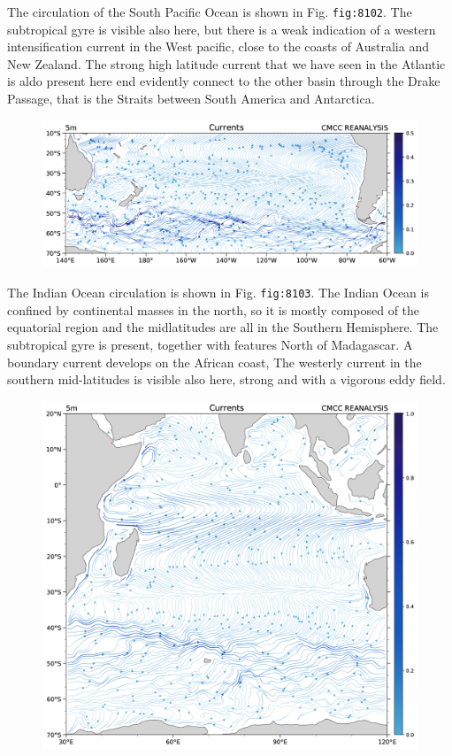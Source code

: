The circulation of the South Pacific Ocean is shown in Fig.
\texttt{fig:8102}. The subtropical gyre is visible also here, but there
is a weak indication of a western intensification current in the West
pacific, close to the coasts of Australia and New Zealand. The strong
high latitude current that we have seen in the Atlantic is aldo present
here end evidently connect to the other basin through the Drake Passage,
that is the Straits between South America and Antarctica.

\begin{figure}
\centering
\includegraphics[width = .7 \textwidth]{figs/GD/UVstream5mGLOBSP.png}
\caption{} \label{fig:}
\end{figure}

The Indian Ocean circulation is shown in Fig. \texttt{fig:8103}. The
Indian Ocean is confined by continental masses in the north, so it is
mostly composed of the equatorial region and the midlatitudes are all in
the Southern Hemisphere. The subtropical gyre is present, together with
features North of Madagascar. A boundary current develops on the African
coast, The westerly current in the southern mid-latitudes is visible
also here, strong and with a vigorous eddy field.

\begin{figure}
\centering
\includegraphics[width = .7 \textwidth]{figs/GD/UVstream5mGLOBIND.png}
\caption{} \label{fig:}
\end{figure}

